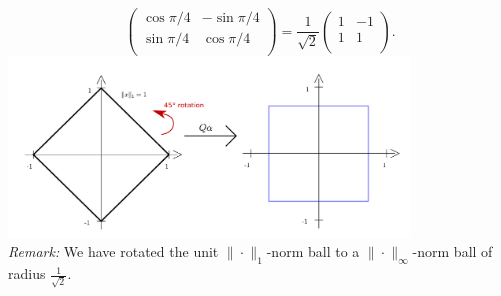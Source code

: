 {\begin{enumerate}
\begin{enumerate}
$$\begin{pmatrix}
		\cos \pi/4 & -\sin \pi/4\\
		\sin \pi/4 & \cos \pi/4\\
		\end{pmatrix} = \frac{1}{\sqrt{2}}\begin{pmatrix}
		1& - 1\\
		1 &  1 \\
		\end{pmatrix}.$$
		 \includegraphics[width=0.8\textwidth]{orthogonalisometricmatrix.pdf}\\
		 \textit{Remark:} We have rotated the unit $\|\cdot\|_1$-norm ball to a $\|\cdot\|_\infty$-norm ball of radius $\frac{1}{\sqrt{2}}$.
		 
	\end{enumerate}
	
\end{enumerate}	

	
	
	
}

